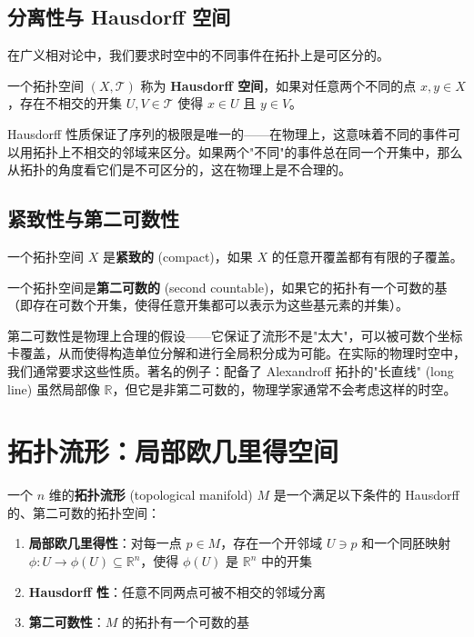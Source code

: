 \subsection{分离性与 Hausdorff 空间}

在广义相对论中，我们要求时空中的不同事件在拓扑上是可区分的。

\begin{definition}[Hausdorff 空间]
一个拓扑空间 $(X, \mathcal{T})$ 称为 \textbf{Hausdorff 空间}，如果对任意两个不同的点 $x, y \in X$，存在不相交的开集 $U, V \in \mathcal{T}$ 使得 $x \in U$ 且 $y \in V$。
\end{definition}

Hausdorff 性质保证了序列的极限是唯一的——在物理上，这意味着不同的事件可以用拓扑上不相交的邻域来区分。如果两个"不同"的事件总在同一个开集中，那么从拓扑的角度看它们是不可区分的，这在物理上是不合理的。

\subsection{紧致性与第二可数性}

\begin{definition}[紧致空间]
一个拓扑空间 $X$ 是\textbf{紧致的} (compact)，如果 $X$ 的任意开覆盖都有有限的子覆盖。
\end{definition}

\begin{definition}[第二可数性]
一个拓扑空间是\textbf{第二可数的} (second countable)，如果它的拓扑有一个可数的基（即存在可数个开集，使得任意开集都可以表示为这些基元素的并集）。
\end{definition}

\begin{remark}
第二可数性是物理上合理的假设——它保证了流形不是"太大"，可以被可数个坐标卡覆盖，从而使得构造单位分解和进行全局积分成为可能。在实际的物理时空中，我们通常要求这些性质。著名的例子：配备了 Alexandroff 拓扑的"长直线" (long line) 虽然局部像 $\mathbb{R}$，但它是非第二可数的，物理学家通常不会考虑这样的时空。
\end{remark}

\section{拓扑流形：局部欧几里得空间}

\begin{definition}[$n$ 维拓扑流形]
一个 $n$ 维的\textbf{拓扑流形} (topological manifold) $M$ 是一个满足以下条件的 Hausdorff 的、第二可数的拓扑空间：
\begin{enumerate}
    \item \textbf{局部欧几里得性}：对每一点 $p \in M$，存在一个开邻域 $U \ni p$ 和一个同胚映射 $\phi: U \to \phi(U) \subseteq \mathbb{R}^n$，使得 $\phi(U)$ 是 $\mathbb{R}^n$ 中的开集
    \item \textbf{Hausdorff 性}：任意不同两点可被不相交的邻域分离
    \item \textbf{第二可数性}：$M$ 的拓扑有一个可数的基
\end{enumerate}
\end{definition}

